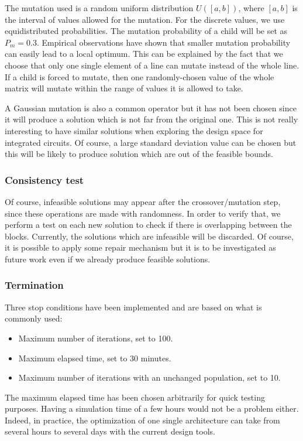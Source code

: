 The mutation used is a random uniform distribution $U([a, b])$, where $[a, b]$ is the interval of values allowed for the mutation. For the discrete values, we use equidistributed probabilities. The mutation probability of a child will be set as $P_{m} = 0.3$. Empirical observations have shown that smaller mutation probability can easily lead to a local optimum. This can be explained by the fact that we choose that only one single element of a line can mutate instead of the whole line. If a child is forced to mutate, then one randomly-chosen value of the whole matrix will mutate within the range of values it is allowed to take.

A Gaussian mutation is also a common operator but it has not been chosen since it will produce a solution which is not far from the original one. This is not really interesting to have similar solutions when exploring the design space for integrated circuits. Of course, a large standard deviation value can be chosen but this will be likely to produce solution which are out of the feasible bounds.

\subsubsection*{Consistency test}
Of course, infeasible solutions may appear after the crossover/mutation step, since these operations are made with randomness. In order to verify that, we perform a test on each new solution to check if there is overlapping between the blocks. Currently, the solutions which are infeasible will be discarded. Of course, it is possible to apply some repair mechanism but it is to be investigated as future work even if we already produce feasible solutions.

\subsubsection*{Termination}
Three stop conditions have been implemented and are based on what is commonly used:
\begin{itemize}
\item Maximum number of iterations, set to 100.
\item Maximum elapsed time, set to 30 minutes.
\item Maximum number of iterations with an unchanged population, set to 10.
\end{itemize}
The maximum elapsed time has been chosen arbitrarily for quick testing purposes. Having a simulation time of a few hours would not be a problem either. Indeed, in practice, the optimization of one single architecture can take from several hours to several days with the current design tools.

